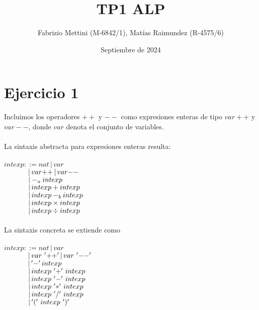 \documentclass{article}
\title{TP1 ALP}
\author{Fabrizio Mettini (M-6842/1), Matías Raimundez (R-4575/6)}
\date{Septiembre de 2024}
\begin{document}
\maketitle

\section{Ejercicio 1}

Incluimos los operadores $++$ y $--$ como expresiones enteras de tipo $var{+}{+}$ y $var{-}{-}$, donde $var$ denota el conjunto de variables.\\\\
\noindent{}La sintaxis abstracta para expresiones enteras resulta:\\\\
$intexp::=nat\,|\,var$\\
${}\hspace{12mm}|\,var{+}{+}\,|\,var{-}{-}$\\
${}\hspace{12mm}|-_u intexp$\\
${}\hspace{12mm}|\,intexp+intexp$\\
${}\hspace{12mm}|\,intexp-_b intexp$\\
${}\hspace{12mm}|\,intexp\times intexp$\\
${}\hspace{12mm}|\,intexp\div intexp$\\\\
\noindent{}La sintaxis concreta se extiende como\\\\
$intexp::=nat\,|\,var$\\
${}\hspace{12mm}|\,var\,\,{'+}{+'}\,|\,var\,\,{'-}{-'}$\\
${}\hspace{12mm}|\,{'-'}\,intexp$\\
${}\hspace{12mm}|\,intexp\,\,{'+'}\,\,intexp$\\
${}\hspace{12mm}|\,intexp\,\,{'-'}\,\,intexp$\\
${}\hspace{12mm}|\,intexp\,\,{'*'}\,\,intexp$\\
${}\hspace{12mm}|\,intexp\,\,{'/'}\,\,intexp$\\
${}\hspace{12mm}|\,{'('}\,\,intexp\,\,{')'}$\\
\end{document}
